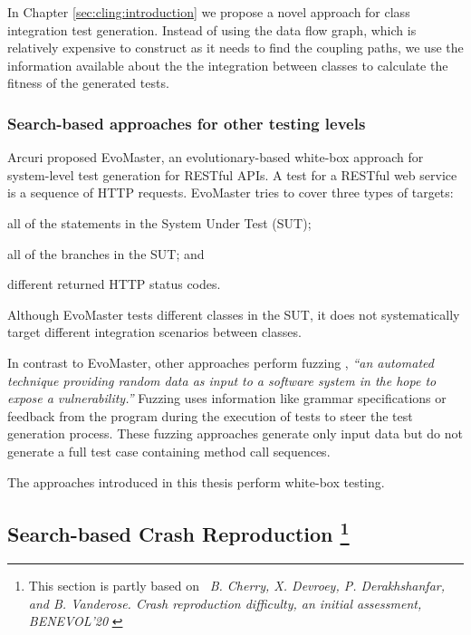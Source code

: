 In Chapter \ref{sec:cling:introduction} we propose a novel approach for class integration test generation.
Instead of using the data flow graph, which is relatively expensive to construct as it needs to find the coupling paths, we use the information available about the the integration between classes to calculate the fitness of the generated tests.
\subsubsection{Search-based approaches for other testing levels}

Arcuri \cite{Arcuri2019} proposed EvoMaster, an evolutionary-based white-box approach for system-level test generation for RESTful APIs. A test for a RESTful web service is a sequence of HTTP requests. EvoMaster tries to cover three types of targets:
 \begin{inparaenum}[(i)]
 \item all of the statements in the System Under Test (SUT);
 \item all of the branches in the SUT; and
\item different returned HTTP status codes.
\end{inparaenum}
Although EvoMaster tests different classes in the SUT, it does not systematically target different integration scenarios between classes.

In contrast to EvoMaster, other approaches perform fuzzing \cite{Holler2012}, \textit{``an automated technique providing random data as input to a software system in the hope to expose a vulnerability.''} Fuzzing uses information like grammar specifications \cite{Holler2012, beyene2012, coppit2005, godefroid2008} or feedback from the program during the execution of tests \cite{Padhye2019} to steer the test generation process.
These fuzzing approaches generate only input data but do not generate a full test case containing method call sequences.

The approaches introduced in this thesis perform white-box testing.

\subsection{Search-based Crash Reproduction \protect\footnote{ This section is partly based on \faFileTextO~\emph{B. Cherry, X. Devroey, P. Derakhshanfar, and B. Vanderose. Crash reproduction difficulty, an initial assessment, BENEVOL'20} \cite{Cherry2020a}}}

